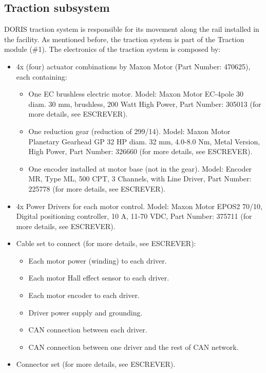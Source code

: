\subsection{Traction subsystem}
DORIS traction system is responsible for its movement along the rail installed in the facility. As mentioned before, the traction system is part of the Traction module (\#1). The electronics of the traction system is composed by:
\begin{itemize}
  \item 4x (four) actuator combinations by Maxon Motor (Part Number: 470625), each containing:
  \begin{itemize}
    \item One EC brushless electric motor. Model: Maxon Motor EC-4pole 30 diam. 30 mm, brushless, 200 Watt High Power, Part Number: 305013 (for more details, see ESCREVER).
    \item One reduction gear (reduction of 299/14). Model: Maxon Motor Planetary Gearhead GP 32 HP diam. 32 mm, 4.0-8.0 Nm, Metal Version, High Power, Part Number: 326660 (for more details, see ESCREVER).
    \item One encoder installed at motor base (not in the gear). Model: Encoder MR, Type ML, 500 CPT, 3 Channels, with Line Driver, Part Number: 225778 (for more details, see ESCREVER).
  \end{itemize}
  \item 4x Power Drivers for each motor control. Model: Maxon Motor EPOS2 70/10, Digital positioning controller, 10 A, 11-70 VDC, Part Number: 375711 (for more details, see ESCREVER).
  \item Cable set to connect (for more details, see ESCREVER):
  \begin{itemize}
    \item Each motor power (winding) to each driver.
    \item Each motor Hall effect sensor to each driver.
    \item Each motor encoder to each driver.
    \item Driver power supply and grounding.
    \item CAN connection between each driver.
    \item CAN connection between one driver and the rest of CAN network.
  \end{itemize}
  \item Connector set (for more details, see ESCREVER).
\end{itemize}

